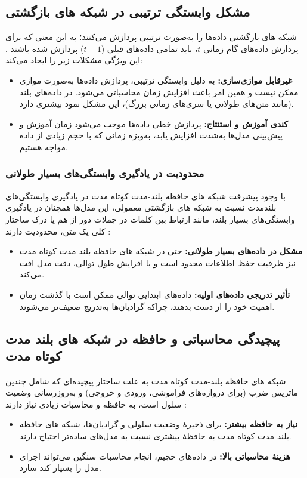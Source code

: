 \subsection{مشکل وابستگی ترتیبی در شبکه های بازگشتی}
شبکه های بازگشتی داده‌ها را به‌صورت ترتیبی پردازش می‌کنند؛ به این معنی که برای پردازش داده‌های گام زمانی \( t \)، باید تمامی داده‌های قبلی (\( t-1 \)) پردازش شده باشند
\cite{rumelhart1986learning,hochreiter1997long}.
این ویژگی مشکلات زیر را ایجاد می‌کند:
\begin{itemize}
	\item \textbf{غیرقابل موازی‌سازی:}  
	به دلیل وابستگی ترتیبی، پردازش داده‌ها به‌صورت موازی ممکن نیست و همین امر باعث افزایش زمان محاسباتی می‌شود. در داده‌های بلند (مانند متن‌های طولانی یا سری‌های زمانی بزرگ)، این مشکل نمود بیشتری دارد.
	
	\item \textbf{کندی آموزش و استنتاج:}  
	پردازش خطی داده‌ها موجب می‌شود زمان آموزش و پیش‌بینی مدل‌ها به‌شدت افزایش یابد، به‌ویژه زمانی که با حجم زیادی از داده مواجه هستیم.
\end{itemize}

\subsubsection{محدودیت در یادگیری وابستگی‌های بسیار طولانی}
با وجود پیشرفت شبکه های حافظه بلند-مدت کوتاه مدت در یادگیری وابستگی‌های بلندمدت نسبت به شبکه های بازگشتی معمولی، این مدل‌ها همچنان در یادگیری وابستگی‌های بسیار بلند، مانند ارتباط بین کلمات در جملات دور از هم یا درک ساختار کلی یک متن، محدودیت دارند
\cite{hochreiter1998vanishing}:
\begin{itemize}
	\item \textbf{مشکل در داده‌های بسیار طولانی:}  
	حتی در شبکه های حافظه بلند-مدت کوتاه مدت  نیز ظرفیت حفظ اطلاعات محدود است و با افزایش طول توالی، دقت مدل افت می‌کند.
	
	\item \textbf{تأثیر تدریجی داده‌های اولیه:}  
	داده‌های ابتدایی توالی ممکن است با گذشت زمان اهمیت خود را از دست بدهند، چراکه گرادیان‌ها به‌تدریج ضعیف‌تر می‌شوند.
\end{itemize}

\subsection{ پیچیدگی محاسباتی و حافظه در شبکه های بلند مدت کوتاه مدت}
شبکه های حافظه بلند-مدت کوتاه مدت به علت ساختار پیچیده‌ای که شامل چندین ماتریس ضرب (برای دروازه‌های فراموشی، ورودی و خروجی) و به‌روزرسانی وضعیت سلول است، به حافظه و محاسبات زیادی نیاز دارند
\cite{goodfellow2016deep}:
\begin{itemize}
	\item \textbf{نیاز به حافظه بیشتر:}  
	برای ذخیرهٔ وضعیت سلولی و گرادیان‌ها، شبکه های حافظه بلند-مدت کوتاه مدت  به حافظهٔ بیشتری نسبت به مدل‌های ساده‌تر احتیاج دارند.
	
	\item \textbf{هزینهٔ محاسباتی بالا:}  
	در داده‌های حجیم، انجام محاسبات سنگین می‌تواند اجرای مدل را بسیار کند سازد.
\end{itemize}

